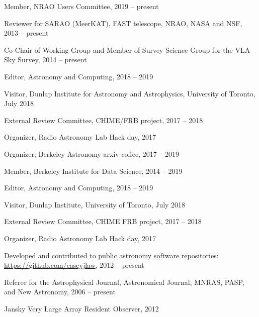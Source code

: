 \documentclass[11pt]{article}
\begin{document}
\begin{bibsection}

    \item Member, NRAO Users Committee, 2019 -- present
  
    \item Reviewer for SARAO (MeerKAT), FAST telescope, NRAO, NASA and NSF, 2013 -- present

    \item Co-Chair of Working Group and Member of Survey Science Group for the VLA Sky Survey, 2014 -- present

    \item Editor, Astronomy and Computing, 2018 -- 2019

    \item Visitor, Dunlap Institute for Astronomy and Astrophysics, University of Toronto, July 2018

    \item External Review Committee, CHIME/FRB project, 2017 -- 2018

    \item Organizer, Radio Astronomy Lab Hack day, 2017
    
    \item Organizer, Berkeley Astronomy arxiv coffee, 2017 -- 2019
    
    \item Member, Berkeley Institute for Data Science, 2014 -- 2019
    
    \item Editor, Astronomy and Computing, 2018 -- 2019
    
    \item Visitor, Dunlap Institute, University of Toronto, July 2018
    
    \item External Review Committee, CHIME FRB project, 2017 -- 2018
    
    \item Organizer, Radio Astronomy Lab Hack day, 2017

    \item Developed and contributed to public astronomy software repositories: \\ \url{https://github.com/caseyjlaw}, 2012 -- present

    \item Referee for the Astrophysical Journal, Astronomical Journal, MNRAS, PASP, and New Astronomy, 2006 -- present

    \item Jansky Very Large Array Resident Observer, 2012


\end{bibsection}
\end{document}
